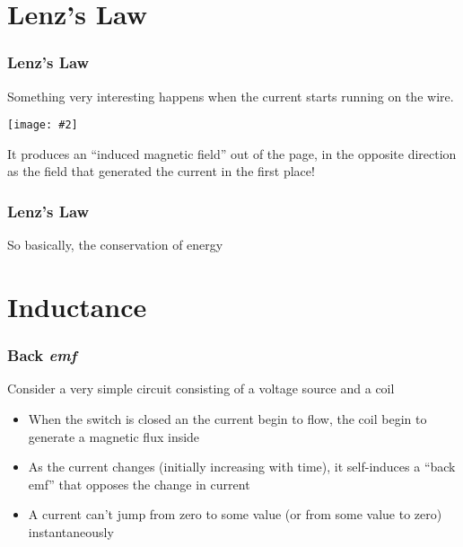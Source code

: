 \documentclass[12pt,aspectratio=169]{beamer}
\newcommand{\pic}[2]{\texttt{[image: \#2]}}
\begin{document}
\section{Lenz's Law}

\begin{frame}
  \frametitle{Lenz's Law}
  Something very interesting happens when the current starts running on the
  wire.

  \vspace{-.2in}
  \begin{center}
    \pic{.35}{motional-emf-2.jpg}
  \end{center}
  
  \vspace{-.1in}It produces an ``induced magnetic field'' out of the page, in
  the opposite direction as the field that generated the current in the first
  place!
\end{frame}


\begin{frame}
  \frametitle{Lenz's Law}
  \begin{center}
  \end{center}

  \vspace{.2in}So basically, the conservation of energy
\end{frame}


\section{Inductance}


\begin{frame}
  \frametitle{Back \emph{emf}}
  Consider a very simple circuit consisting of a voltage source and a coil
  \begin{center}
  \end{center}
  \begin{itemize}
  \item When the switch is closed an the current begin to flow, the coil
    begin to generate a magnetic flux inside
  \item As the current changes (initially increasing with time), it
    self-induces a ``back emf'' that opposes the change in current
  \item A current can't jump from zero to some value (or from some value to
    zero) instantaneously
  \end{itemize}
\end{frame}
\end{document}
